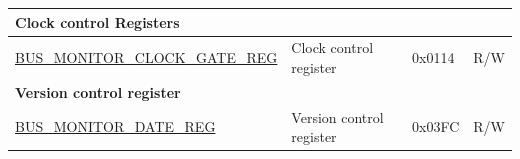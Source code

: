 \begin{longtable}{ |m{11.5cm}| p{8cm}| l | l | }
\multicolumn{4}{|l|}{\textbf{Clock control Registers}} \\ \hline
\hyperref[regdesc:BUSMONITORCLOCKGATEREG]{BUS\_MONITOR\_CLOCK\_GATE\_REG} & Clock control register & 0x0114 & R/W \\ \hline
\multicolumn{4}{|l|}{\textbf{Version control register}} \\ \hline
\hyperref[regdesc:BUSMONITORDATEREG]{BUS\_MONITOR\_DATE\_REG} & Version control register & 0x03FC & R/W \\ \hline
\end{longtable}
